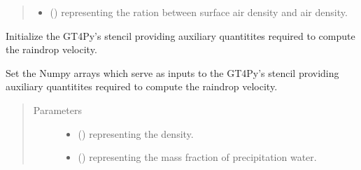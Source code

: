 \documentclass[letterpaper,10pt,english]{sphinxmanual}
\begin{document}
\begin{fulllineitems}
\begin{fulllineitems}
\begin{quote}
\begin{description}
\begin{itemize}
\item {} 
 () \textendash{}  representing the ration between surface air density and air density.

\end{itemize}


\end{description}\end{quote}

\end{fulllineitems}


\begin{fulllineitems}
\label{\detokenize{api:parameterizations.adjustment_microphysics.AdjustmentMicrophysics._stencil_raindrop_fall_velocity_initialize}}
Initialize the GT4Py’s stencil providing auxiliary quantitites required to compute the raindrop velocity.

\end{fulllineitems}


\begin{fulllineitems}
\label{\detokenize{api:parameterizations.adjustment_microphysics.AdjustmentMicrophysics._stencil_raindrop_fall_velocity_set_inputs}}
Set the Numpy arrays which serve as inputs to the GT4Py’s stencil providing auxiliary quantitites required to
compute the raindrop velocity.
\begin{quote}\begin{description}
\item[{Parameters}] \leavevmode\begin{itemize}
\item {} 
 () \textendash{}  representing the density.

\item {} 
 () \textendash{}  representing the mass fraction of precipitation water.


\end{itemize}
\end{description}
\end{quote}
\end{fulllineitems}
\end{fulllineitems}
\end{document}
